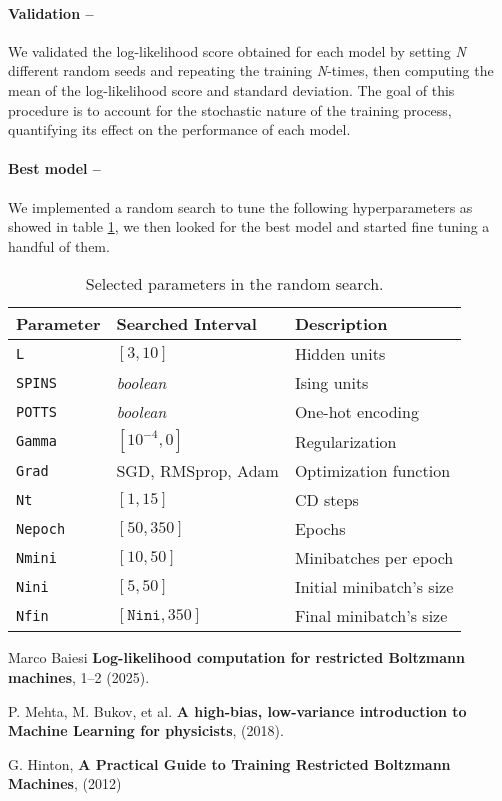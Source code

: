 \documentclass[prl,twocolumn]{revtex4-1}
\begin{document}
\paragraph{\bf Validation --}

We validated the log-likelihood score obtained for each model by setting \emph{N} different random seeds and repeating the training \emph{N}-times, then computing the mean of the log-likelihood score and standard deviation. The goal of this procedure is to account for the stochastic nature of the training process, quantifying its effect on the performance of each model.
\paragraph{\bf Best model --}
We implemented a random search to tune the following hyperparameters as showed in table \ref{table:hyperparameters}, we then looked for the best model and started fine tuning a handful of them.

\begin{table}[]
\label{table:hyperparameters}
\begin{tabular}{lll}
\toprule
Parameter & Searched Interval & Description \\ \hline
\texttt{L}&$[3,10]$ & Hidden units \\
\texttt{SPINS}& \emph{boolean}& Ising units  \\
\texttt{POTTS}& \emph{boolean} & One-hot encoding  \\ 
\texttt{Gamma}& $\left[10^{-4},0 \right]$ & Regularization \\
\texttt{Grad} & SGD, RMSprop, Adam & Optimization function\\
\texttt{Nt} & $[1,15]$& CD steps \\
\texttt{Nepoch} & $[50,350]$ & Epochs\\
\texttt{Nmini} & $[10,50]$ & Minibatches per epoch\\
\texttt{Nini} & $[5,50]$ & Initial minibatch's size\\
\texttt{Nfin} & $[\texttt{Nini},350]$ & Final minibatch's size\\ \toprule
\end{tabular}
\caption{Selected parameters in the random search.}
\end{table}
\begin{thebibliography}{99}

  Marco Baiesi {\bf Log-likelihood computation for restricted Boltzmann machines}, 1--2 (2025).
  
  P. Mehta, 
  M. Bukov, et al. {\bf A high-bias, low-variance introduction to Machine Learning for physicists}, (2018).

  G. Hinton, {\bf A Practical Guide to Training Restricted Boltzmann Machines}, (2012)


\end{thebibliography}

\clearpage
\end{document}
